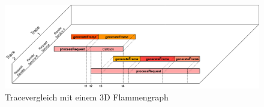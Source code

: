 \begin{figure}[!ht]
	\centering
	\includegraphics[scale=0.4]{img/Design/3D-Flammengraph-Vergleich.png}
	\caption[Darstellungsbeispiel eines Tracevergleich mit einem 3D Flammengraph]{ Tracevergleich mit einem 3D Flammengraph}
	\label{fig:3D-Flammengraph-Vergleich}
\end{figure}

